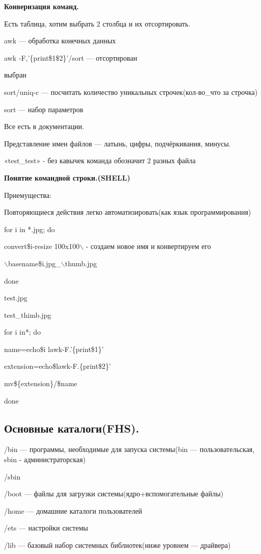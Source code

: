 \par \textbf{Конверизация
команд.}
\par Есть
таблица, хотим выбрать 2 столбца и их
отсортировать.
\par  awk —
обработка конечных данных
\par  awk
-F,'\{print\$1\$2\}'/sort — отсортирован
\par             
  выбран
\par  sort/uniq-c
— посчитать количество уникальных
строчек(кол-во\_что за строчка)
\par  sort —
набор параметров
\par Все есть
в документации.
\par Представление
имен файлов — латынь, цифры, подчёркивания,
минусы.
\par «test\_test»
- без кавычек команда обозначит 2 разных
файла


\par \textbf{Понятие
командной строки.(SHELL)}
\par 
Приемущества:
\par 
Повторяющиеся действия легко
автоматизировать(как язык программирования)

\par  for
i in *.jpg; do
\par 
	convert\$i-resize 100x100$\backslash$          - создаем новое имя
и конвертируем его
\par 
	$\backslash$basename\$i.jpg\_$\backslash$thumb.jpg
\par  done
\par  test.jpg
\par 
test\_thimb.jpg


\par  for i in*;
do
\par 	name=echo\$i
lawk-F.'\{print\$1\}'
\par 	extension=echo\$lawk-F.\{print\$2\}'
\par 	mv\$\{extension\}/\$name
\par  done


\subsection {Основные каталоги(FHS).}
\par /bin
— программы, необходимые для запуска
системы(bin — пользовательская, sbin - 
	администраторская)
\par 
/sbin
\par 
/boot — файлы для загрузки
системы(ядро+вспомогательные файлы)
\par 
/home — домашние каталоги пользователей
\par 
/ets — настройки системы
\par 
/lib — базовый набор системных библиотек(ниже
уровнем — драйвера) 

